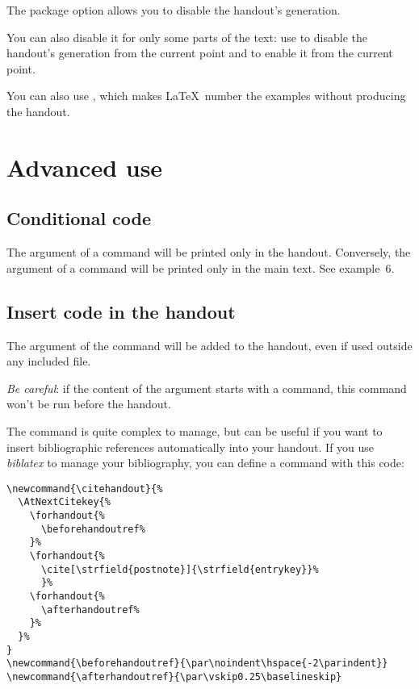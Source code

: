 \documentclass{ltxdockit}[2011/03/25]
\begin{document}
The package option  allows you to disable the handout's generation.

\label{enablehandout}You can also disable it for only some parts of the text: use  to disable the handout's generation from the current point and  to enable it from the current point.

\label{printing} You can also use , which makes \LaTeX\ number the examples without producing the handout.

\section{Advanced use}
\subsection{Conditional code}

The argument of a   command will be printed only in the handout. Conversely, the argument of a command  will be printed only in the main text. See example~6.

\subsection{Insert code in the handout}

The argument of the   command will be added to the handout, even if used outside any included file.

\emph{Be careful}: if the content of the argument starts with a command, this command won't be run before the handout.

The  command is quite complex to manage, but can be useful if you want to insert bibliographic references automatically into your handout. If you use \emph{biblatex} to manage your bibliography, you can define a  command with this code:


\begin{verbatim}
\newcommand{\citehandout}{%
  \AtNextCitekey{%
    \forhandout{%
      \beforehandoutref%
    }%
    \forhandout{%
      \cite[\strfield{postnote}]{\strfield{entrykey}}%
      }%
    \forhandout{%
      \afterhandoutref%
    }%
  }%
}
\newcommand{\beforehandoutref}{\par\noindent\hspace{-2\parindent}}
\newcommand{\afterhandoutref}{\par\vskip0.25\baselineskip}
\end{verbatim}
\end{document}
